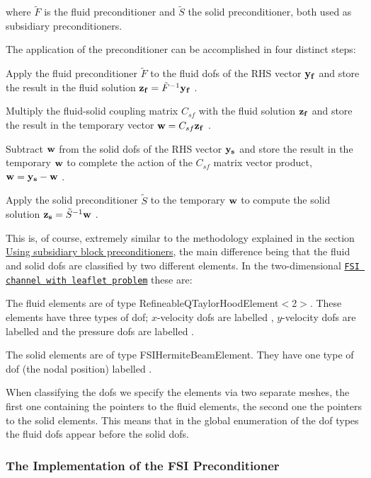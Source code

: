 where $ \tilde F $ is the fluid preconditioner and $ \tilde{S} $ the solid preconditioner, both used as subsidiary preconditioners.

The application of the preconditioner can be accomplished in four distinct steps\+:


\begin{DoxyEnumerate}
\item Apply the fluid preconditioner $ \tilde F $ to the fluid dofs of the R\+HS vector $ \bf y_f $ and store the result in the fluid solution $ {\bf z_f}=\tilde F^{-1}{\bf y_f} $ .
\item Multiply the fluid-\/solid coupling matrix $ C_{sf} $ with the fluid solution $ \bf z_f $ and store the result in the temporary vector $ {\bf w}=C_{sf}\bf z_f $ .
\item Subtract $ \bf w $ from the solid dofs of the R\+HS vector $ \bf y_s $ and store the result in the temporary $ \bf w $ to complete the action of the $ C_{sf} $ matrix vector product, $ {\bf w}={\bf y_s}-{\bf w} $ .
\item Apply the solid preconditioner $\tilde S$ to the temporary $ \bf w $ to compute the solid solution $ {\bf z_s}=\tilde S^{-1}{\bf w} $ .
\end{DoxyEnumerate}This is, of course, extremely similar to the methodology explained in the section \hyperlink{index_two_plus_three_upper_triangular_with_sub}{Using subsidiary block preconditioners}, the main difference being that the fluid and solid dofs are classified by two different elements. In the two-\/dimensional \href{../../../interaction/fsi_channel_with_leaflet/html/index.html}{\tt F\+SI channel with leaflet problem} these are\+:
\begin{DoxyItemize}
\item The fluid elements are of type {\ttfamily Refineable\+Q\+Taylor\+Hood\+Element$<$2$>$}. These elements have three types of dof; $x$-\/velocity dofs are labelled {}, $y$-\/velocity dofs are labelled {} and the pressure dofs are labelled {}.~\newline
~\newline

\item The solid elements are of type {\ttfamily F\+S\+I\+Hermite\+Beam\+Element}. They have one type of dof (the nodal position) labelled {}.
\end{DoxyItemize}When classifying the dofs we specify the elements via two separate meshes, the first one containing the pointers to the fluid elements, the second one the pointers to the solid elements. This means that in the global enumeration of the dof types the fluid dofs appear before the solid dofs.\hypertarget{index_implementing_the_fsi_preconditioner}{}\subsubsection{The Implementation of the F\+S\+I Preconditioner}\label{index_implementing_the_fsi_preconditioner}
